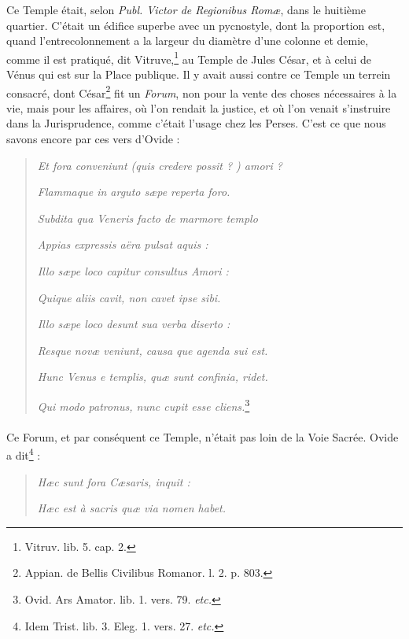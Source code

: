 \documentclass[a4paper, 18pt, oneside]{article}
\begin{document}
Ce Temple était, selon \emph{Publ. Victor de Regionibus Romæ}, dans le huitième quartier. C'était un édifice superbe avec un pycnostyle, dont la proportion est, quand l'entrecolonnement a la largeur du diamètre d'une colonne et demie, comme il est pratiqué, dit Vitruve,\footnote{Vitruv. lib. 5. cap. 2.} au Temple de Jules César, et à celui de Vénus qui est sur la Place publique. Il y avait aussi contre ce Temple un terrein consacré, dont César\footnote{Appian. de Bellis Civilibus Romanor. l. 2. p. 803.} fit un \emph{Forum}, non pour la vente des choses nécessaires à la vie, mais pour les affaires, où l'on rendait la justice, et où l'on venait s'instruire dans la Jurisprudence, comme c'était l'usage chez les Perses. C'est ce que nous savons encore par ces vers d'Ovide :
\begin{quotation}
\hspace*{5mm}\emph{Et fora conveniunt (quis credere possit ? ) amori ?} 

\hspace*{5mm}\emph{Flammaque in arguto sæpe reperta foro.}

\emph{Subdita qua Veneris facto de marmore templo}

\hspace*{5mm}\emph{Appias expressis aëra pulsat aquis :}

\emph{Illo sæpe loco capitur consultus Amori :}

\hspace*{5mm}\emph{Quique aliis cavit, non cavet ipse sibi.}

\emph{Illo sæpe loco desunt sua verba diserto :}

\hspace*{5mm}\emph{Resque novæ veniunt, causa que agenda sui est.}

\emph{Hunc Venus e templis, quæ sunt confinia, ridet.}

\hspace*{5mm}\emph{Qui modo patronus, nunc cupit esse cliens.}\footnote{Ovid. Ars Amator. lib. 1. vers. 79. \emph{etc.}}
\end{quotation}
\paragraph{}
Ce Forum, et par conséquent ce Temple, n'était pas loin de la Voie Sacrée. Ovide a dit\footnote{Idem Trist. lib. 3. Eleg. 1. vers. 27. \emph{etc.}} :
\begin{quotation}
\hspace*{5mm}\emph{Hæc sunt fora Cæsaris, inquit :}

\emph{Hæc est à sacris quæ via nomen habet.}
\end{quotation}
\end{document}
